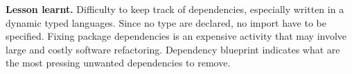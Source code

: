 \documentclass[runningheads]{llncs}
\newcommand{\eg}{\emph{e.g.,}\xspace}
\newcommand{\myparagraph}[1]{\noindent \textbf{#1.}}
\begin{document}
\myparagraph{Lesson learnt}
Difficulty to keep track of dependencies, especially written in a dynamic typed languages. Since no type are declared, no import have to be specified. Fixing package dependencies is an expensive activity that may involve large and costly software refactoring.  Dependency blueprint indicates what are the most pressing unwanted dependencies to remove.




\end{document}
